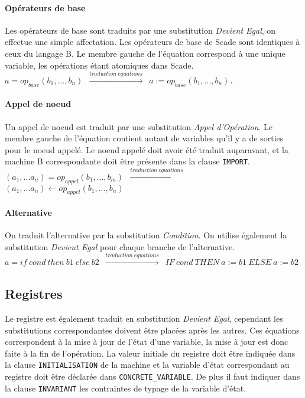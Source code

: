 \paragraph{Opérateurs de base}
Les opérateurs de base sont traduits par une substitution \emph{Devient Egal}, on
effectue une simple affectation. Les opérateurs de base de Scade sont identiques
à ceux du langage B. Le membre gauche de l'équation correspond à une unique
variable, les opérations étant atomiques dans Scade. \\

\texttt{$a = op_{base}(b_1,...,b_n)$ $\xrightarrow{traduction ~
equations}$ $a:=op_{base}(b_1,...,b_n)$. }

\paragraph{Appel de noeud}
Un appel de noeud est traduit par une substitution \emph{Appel d'Opération}. Le
membre gauche de l'équation contient autant de variables qu'il y a de sorties
pour le noeud appelé. Le noeud appelé doit avoir été traduit auparavant, et la
machine B correspondante doit être présente dans la clause \texttt{IMPORT}.\\

\texttt{$(a_1, ... a_n) = op_{appel}(b_1, ..., b_m)$
$\xrightarrow{traduction ~ equations}$ $(a_1, ... a_n) \leftarrow
op_{appel}(b_1,..., b_n)$} 

\paragraph{Alternative}
On traduit l'alternative par la substitution \emph{Condition}. On utilise
également la substitution \emph{Devient Egal} pour chaque branche de l'alternative.\\

\texttt{$ a = if~ cond~ then~ b1~ else~ b2$ $\xrightarrow{traduction ~ equations}$ $IF ~cond~ THEN ~a:=b1~ ELSE
~a:=b2$}



\subsection*{Registres}

Le registre est également traduit en substitution \emph{Devient Egal}, cependant
les substitutions correspondantes doivent être placées après les autres. Ces
équations correspondent à la mise à jour de l'état d'une variable, la mise à
jour est donc faite à la fin de l'opération. La valeur initiale du registre doit
être indiquée dans la clause \texttt{INITIALISATION} de la machine et la variable d'état
correspondant au registre doit être déclarée dans \texttt{CONCRETE\_VARIABLE}. De
plus il faut indiquer dans la clause \texttt{INVARIANT} les contraintes de typage
de la variable d'état. \\

